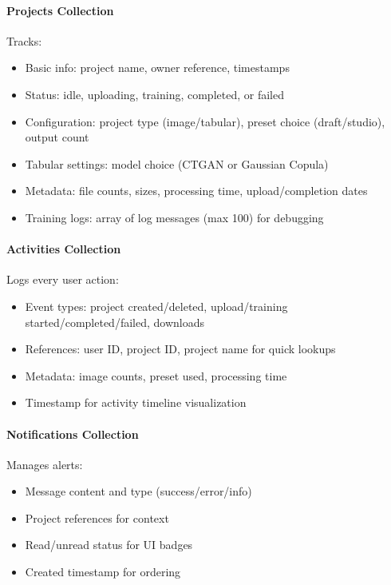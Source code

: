 \documentclass[11pt,a4paper]{article}
\begin{document}
\paragraph{Projects Collection} Tracks:
\begin{itemize}[noitemsep]
    \item Basic info: project name, owner reference, timestamps
    \item Status: idle, uploading, training, completed, or failed
    \item Configuration: project type (image/tabular), preset choice (draft/studio), output count
    \item Tabular settings: model choice (CTGAN or Gaussian Copula)
    \item Metadata: file counts, sizes, processing time, upload/completion dates
    \item Training logs: array of log messages (max 100) for debugging
\end{itemize}

\paragraph{Activities Collection} Logs every user action:
\begin{itemize}[noitemsep]
    \item Event types: project created/deleted, upload/training started/completed/failed, downloads
    \item References: user ID, project ID, project name for quick lookups
    \item Metadata: image counts, preset used, processing time
    \item Timestamp for activity timeline visualization
\end{itemize}

\paragraph{Notifications Collection} Manages alerts:
\begin{itemize}[noitemsep]
    \item Message content and type (success/error/info)
    \item Project references for context
    \item Read/unread status for UI badges
    \item Created timestamp for ordering
\end{itemize}
\end{document}

